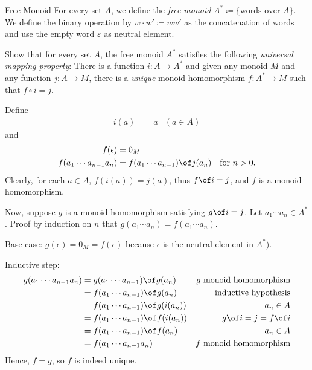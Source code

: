 \begin{definition}{Free Monoid}
  For every set $A$, we define the \emph{free monoid} $A^* \coloneqq \lbrace \text{words over $A$} \rbrace$.
  We define the binary operation by $w \cdot w' \coloneqq ww'$ as the concatenation of words and use the empty word $\varepsilon$ as neutral element.
\end{definition}

\begin{exercise}
  Show that for every set $A$, the free monoid $A^*$ satisfies the following \emph{universal mapping property}:
  There is a function $i : A \to A^*$ and given any monoid $M$ and any function $j : A \to M$, there is a \emph{unique} monoid homomorphism $f : A^* \to M$ such that $f \circ i = j$.
\end{exercise}

\begin{answer}
  Define
  \begin{align*}
    i(a)&=a &(a\in A)
  \end{align*}
  and
  \begin{align*}
    f(\epsilon)&=0_M&\\
    f(a_1\cdots a_{n-1}a_n)&=f(a_1\cdots a_{n-1})\of j(a_n) &\text{for }n>0.
  \end{align*}
  Clearly, for each $a\in A$, $f(i(a))=j(a)$, thus $f\of i=j$, and $f$ is a monoid homomorphism.

  Now, suppose $g$ is a monoid homomorphism satisfying $g\of i=j$.
  Let $a_1\cdots a_n\in A^*$. Proof by induction on $n$ that $g(a_1\cdots a_n)=f(a_1\cdots a_n)$.

  Base case: $g(\epsilon)=0_M=f(\epsilon)$ because $\epsilon$ is the neutral element in $A^*$).

  Inductive step:
  \begin{align*}
    g(a_1\cdots a_{n-1}a_n)&=g(a_1\cdots a_{n-1})\of g(a_n)&g\text{ monoid homomorphism}\\
                           &=f(a_1\cdots a_{n-1})\of g(a_n)&\text{inductive hypothesis}\\
                           &=f(a_1\cdots a_{n-1})\of g(i(a_n)) & a_n\in A\\
                           &=f(a_1\cdots a_{n-1})\of f(i(a_n)) & g\of i=j=f\of i\\
                           &=f(a_1\cdots a_{n-1})\of f(a_n) & a_n\in A\\
                           &=f(a_1\cdots a_{n-1}a_n)&f\text{ monoid homomorphism}
  \end{align*}
  Hence, $f=g$, so $f$ is indeed unique.

\end{answer}

